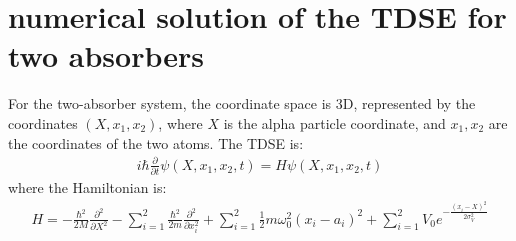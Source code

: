 \section{numerical solution of the TDSE for two absorbers}

For the two-absorber system, the coordinate space is 3D, represented by the coordinates $(X, x_1, x_2)$, where $X$ is the alpha particle coordinate, and $x_1, x_2$ are the coordinates of the two atoms. The TDSE is:
\begin{align}
  i\hbar \frac{\partial}{\partial t}\psi(X, x_1, x_2, t) = H \psi(X, x_1, x_2, t)
\end{align}
where the Hamiltonian is:
\begin{align}
  H = -\frac{\hbar^2}{2M}\frac{\partial^2}{\partial X^2} - \sum_{i=1}^2 \frac{\hbar^2}{2m}\frac{\partial^2}{\partial x_i^2} + \sum_{i=1}^2 \frac{1}{2}m\omega_0^2(x_i-a_i)^2 + \sum_{i=1}^2 V_0 e^{-\frac{(x_i-X)^2}{2\sigma_V^2}}
\end{align}

